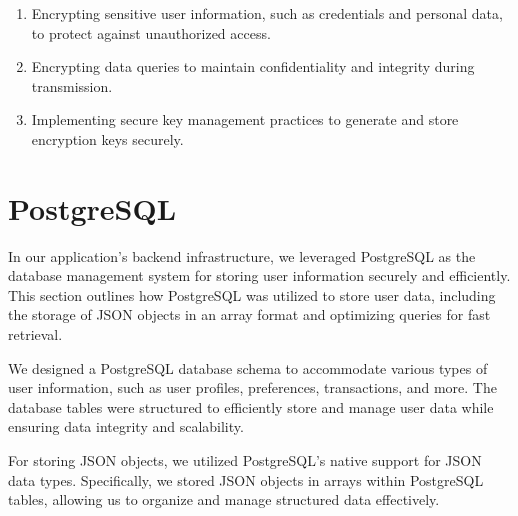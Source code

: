 \begin{enumerate}
  \item Encrypting sensitive user information, such as credentials and personal data, to protect against unauthorized access.
  \item Encrypting data queries to maintain confidentiality and integrity during transmission.
  \item Implementing secure key management practices to generate and store encryption keys securely.
\end{enumerate}


\section{PostgreSQL}

In our application's backend infrastructure, we leveraged PostgreSQL as the database management system for storing user information securely and efficiently. This section outlines how PostgreSQL was utilized to store user data, including the storage of JSON objects in an array format and optimizing queries for fast retrieval.

We designed a PostgreSQL database schema to accommodate various types of user information, such as user profiles, preferences, transactions, and more. The database tables were structured to efficiently store and manage user data while ensuring data integrity and scalability.

For storing JSON objects, we utilized PostgreSQL's native support for JSON data types. Specifically, we stored JSON objects in arrays within PostgreSQL tables, allowing us to organize and manage structured data effectively.


